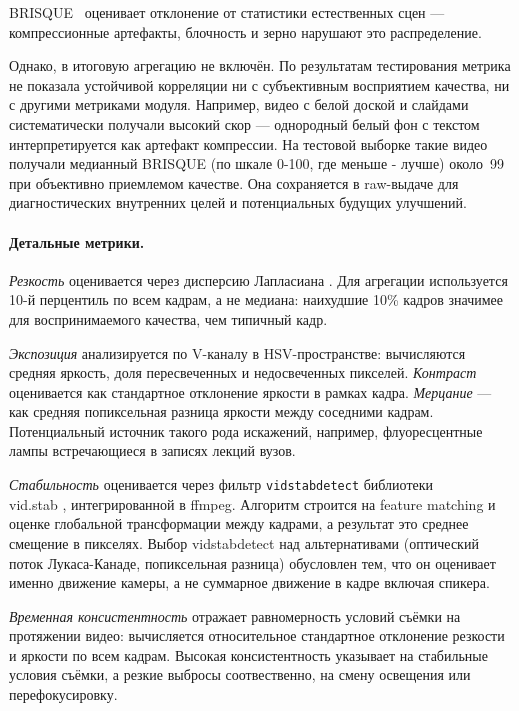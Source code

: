 BRISQUE~\cite{mittal2012brisque} оценивает отклонение от статистики
естественных сцен — компрессионные артефакты, блочность и зерно
нарушают это распределение.

Однако, в итоговую агрегацию не включён.
По результатам тестирования метрика не показала устойчивой корреляции
ни с субъективным восприятием качества, ни с другими метриками модуля.
Например, видео с белой доской и слайдами систематически получали
высокий скор — однородный белый фон с текстом
интерпретируется как артефакт компрессии.
На тестовой выборке такие видео получали медианный BRISQUE (по шкале 0-100, где меньше - лучше) около~99
при объективно приемлемом качестве. Она сохраняется в raw-выдаче
для диагностических внутренних целей и потенциальных будущих улучшений.

\paragraph{Детальные метрики.}

\textit{Резкость} оценивается через дисперсию Лапласиана \cite{pechpacheco2000laplacian}.
Для агрегации используется 10-й перцентиль по всем кадрам, а не медиана:
наихудшие 10\% кадров значимее для воспринимаемого качества,
чем типичный кадр.

\textit{Экспозиция} анализируется по V-каналу в HSV-пространстве:
вычисляются средняя яркость, доля пересвеченных и недосвеченных пикселей.
\textit{Контраст} оценивается как стандартное отклонение яркости в рамках кадра.
\textit{Мерцание} — как средняя попиксельная разница яркости между соседними кадрам. Потенциальный источник такого рода искажений, например, 
флуоресцентные лампы встречающиеся в записях лекций вузов.

\textit{Стабильность} оценивается через фильтр \texttt{vidstabdetect} библиотеки \\
vid.stab \cite{vidstab}, интегрированной в ffmpeg.
Алгоритм строится на feature matching и оценке глобальной трансформации между кадрами, а
результат это среднее смещение в пикселях.
Выбор vidstabdetect над альтернативами (оптический поток Лукаса-Канаде,
попиксельная разница) обусловлен тем, что он оценивает именно движение камеры,
а не суммарное движение в кадре включая спикера.

\textit{Временная консистентность} отражает равномерность условий съёмки
на протяжении видео: вычисляется относительное стандартное отклонение
резкости и яркости по всем кадрам. Высокая консистентность указывает
на стабильные условия съёмки, а резкие выбросы соотвественно, на смену освещения
или перефокусировку.

